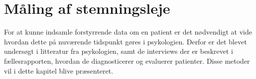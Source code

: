 \chapter{Måling af stemningsleje}\label{maaling_af_stemningsleje}
For at kunne indsamle forstyrrende data om en patient er det nødvendigt at vide hvordan dette på nuværende tidspunkt gøres i psykologien.
Derfor er det blevet undersøgt i litteratur fra psykologien, samt de interviews der er beskrevet i fællesrapporten, hvordan de diagnosticerer og evaluerer patienter. 
Disse metoder vil i dette kapitel blive præsenteret.

\label{PANAS}



